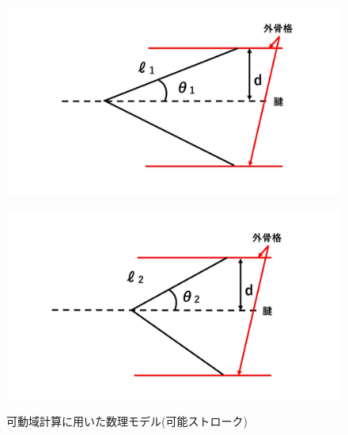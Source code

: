 \begin{figure}[ht]
  \begin{minipage}{0.49\hsize}
    \centering  
    \includegraphics[scale=0.23]{image/model_2_open.jpg}
    \label{fig:model_2_before}
  \end{minipage}
  \begin{minipage}{0.49\hsize}
    \centering
    \includegraphics[scale=0.23]{image/model_2_close.jpg}
    \label{fig:model_2_after}
  \end{minipage}
  \caption{可動域計算に用いた数理モデル(可能ストローク)}
  \label{fig:model_2}
\end{figure}
